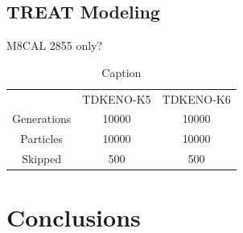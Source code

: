 \documentclass{anstrans}
\begin{document}


\subsection{TREAT Modeling}
M8CAL 2855 only?

\begin{table}[h]
    \centering
    \begin{tabular}{c|c|c}
         & TDKENO-K5 & TDKENO-K6 \\
        Generations &  10000 & 10000 \\
        Particles   &  10000 & 10000 \\
        Skipped     &  500   & 500  \\
    \end{tabular}
    \caption{Caption}
    \label{tab:my_label}
\end{table}

\section{Conclusions}
\end{document}
